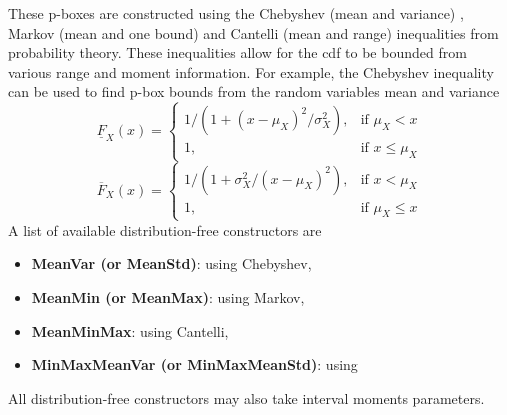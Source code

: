 \documentclass{juliacon}
\begin{document}
These p-boxes are constructed using the Chebyshev (mean and variance) \cite{chebyshev1874valeurs}, Markov (mean and one bound) \cite{markoff1900question} and Cantelli (mean and range) inequalities from probability theory. These inequalities allow for the cdf to be bounded from various range and moment information. For example, the Chebyshev inequality can be used to find p-box bounds from the random variables mean and variance
\begin{equation*}
  \underline{F}_{X}(x) = \begin{cases} 1 / (1 + (x - \mu_{X})^2 / \sigma^{2}_{X}),& \text{if } \mu_{X}<x \\
    1,& \text{if } x\leq \mu_{X} \end{cases}
\end{equation*}
\begin{equation*}
  \overline{F}_{X}(x)  = \begin{cases} 1 / (1 + \sigma^{2}_{X}/(x - \mu_{X})^2),& \text{if } x<\mu_{X} \\
  1,& \text{if } \mu_{X}\leq x \end{cases}
\end{equation*}
\noindent A list of available distribution-free constructors are
\begin{itemize}
  \item \textbf{MeanVar (or MeanStd)}: using Chebyshev,
  \item \textbf{MeanMin (or MeanMax)}: using Markov,
  \item \textbf{MeanMinMax}: using Cantelli,
  \item \textbf{MinMaxMeanVar (or MinMaxMeanStd)}: using \cite{ferson2021distribution}
\end{itemize}
\noindent All distribution-free constructors may also take interval moments parameters.
\end{document}
